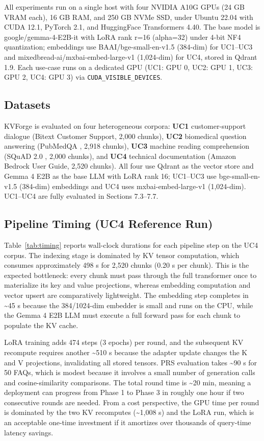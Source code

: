 \documentclass[10pt,twocolumn]{article}
\begin{document}
All experiments run on a single host with four NVIDIA A10G GPUs (24 GB VRAM each), 16 GB RAM, and 250 GB NVMe SSD, under Ubuntu 22.04 with CUDA 12.1, PyTorch 2.1, and HuggingFace Transformers 4.40. The base model is google/gemma-4-E2B-it with LoRA rank r=16 (alpha=32) under 4-bit NF4 quantization; embeddings use BAAI/bge-small-en-v1.5 (384-dim) for UC1--UC3 and mixedbread-ai/mxbai-embed-large-v1 (1,024-dim) for UC4, stored in Qdrant 1.9. Each use-case runs on a dedicated GPU (UC1: GPU 0, UC2: GPU 1, UC3: GPU 2, UC4: GPU 3) via \texttt{CUDA\_VISIBLE\_DEVICES}.


\subsection{Datasets}

KVForge is evaluated on four heterogeneous corpora: \textbf{UC1} customer-support dialogue (Bitext Customer Support, 2,000 chunks), \textbf{UC2} biomedical question answering (PubMedQA \cite{ref15}, 2,918 chunks), \textbf{UC3} machine reading comprehension (SQuAD 2.0 \cite{ref16}, 2,000 chunks), and \textbf{UC4} technical documentation (Amazon Bedrock User Guide, 2,520 chunks). All four use Qdrant as the vector store and Gemma 4 E2B as the base LLM with LoRA rank 16; UC1--UC3 use bge-small-en-v1.5 (384-dim) embeddings and UC4 uses mxbai-embed-large-v1 (1,024-dim). UC1--UC4 are fully evaluated in Sections 7.3--7.7.


\subsection{Pipeline Timing (UC4 Reference Run)}

Table~\ref{tab:timing} reports wall-clock durations for each pipeline step on the UC4 corpus. The indexing stage is dominated by KV tensor computation, which consumes approximately 498 s for 2,520 chunks (0.20 s per chunk). This is the expected bottleneck: every chunk must pass through the full transformer once to materialize its key and value projections, whereas embedding computation and vector upsert are comparatively lightweight. The embedding step completes in \textasciitilde{}45 s because the 384/1024-dim embedder is small and runs on the CPU, while the Gemma 4 E2B LLM must execute a full forward pass for each chunk to populate the KV cache.


LoRA training adds 474 steps (3 epochs) per round, and the subsequent KV recompute requires another \textasciitilde{}510 s because the adapter update changes the K and V projections, invalidating all stored tensors. PRS evaluation takes \textasciitilde{}90 s for 50 FAQs, which is modest because it involves a small number of generation calls and cosine-similarity comparisons. The total round time is \textasciitilde{}20 min, meaning a deployment can progress from Phase 1 to Phase 3 in roughly one hour if two consecutive rounds are needed. From a cost perspective, the GPU time per round is dominated by the two KV recomputes (\textasciitilde{}1,008 s) and the LoRA run, which is an acceptable one-time investment if it amortizes over thousands of query-time latency savings.
\end{document}
